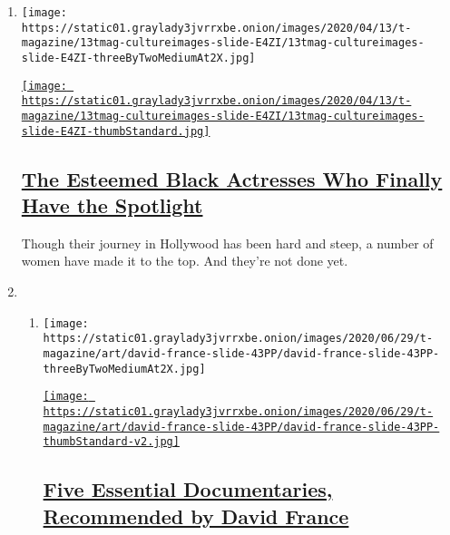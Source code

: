 \begin{enumerate}
\def\labelenumi{\arabic{enumi}.}
\item
  \texttt{[image: https://static01.graylady3jvrrxbe.onion/images/2020/04/13/t-magazine/13tmag-cultureimages-slide-E4ZI/13tmag-cultureimages-slide-E4ZI-threeByTwoMediumAt2X.jpg]}

  \href{/interactive/2020/04/13/t-magazine/black-actresses-bassett-berry-blige-henson-whitfield-elise.html}{\texttt{[image: https://static01.graylady3jvrrxbe.onion/images/2020/04/13/t-magazine/13tmag-cultureimages-slide-E4ZI/13tmag-cultureimages-slide-E4ZI-thumbStandard.jpg]}}

  \hypertarget{the-esteemed-black-actresses-who-finally-have-the-spotlight}{%
  \subsection{\texorpdfstring{\href{/interactive/2020/04/13/t-magazine/black-actresses-bassett-berry-blige-henson-whitfield-elise.html}{The
  Esteemed Black Actresses Who Finally Have the
  Spotlight}}{The Esteemed Black Actresses Who Finally Have the Spotlight}}\label{the-esteemed-black-actresses-who-finally-have-the-spotlight}}

  Though their journey in Hollywood has been hard and steep, a number of
  women have made it to the top. And they're not done yet.
\item
  \begin{enumerate}
  \def\labelenumii{\arabic{enumii}.}
  \item
    \texttt{[image: https://static01.graylady3jvrrxbe.onion/images/2020/06/29/t-magazine/art/david-france-slide-43PP/david-france-slide-43PP-threeByTwoMediumAt2X.jpg]}

    \href{/2020/06/29/t-magazine/david-france-documentary-watch-list.html}{\texttt{[image: https://static01.graylady3jvrrxbe.onion/images/2020/06/29/t-magazine/art/david-france-slide-43PP/david-france-slide-43PP-thumbStandard-v2.jpg]}}

    \hypertarget{five-essential-documentaries-recommended-by-david-france}{%
    \subsection{\texorpdfstring{\href{/2020/06/29/t-magazine/david-france-documentary-watch-list.html}{Five
    Essential Documentaries, Recommended by David
    France}}{Five Essential Documentaries, Recommended by David France}}\label{five-essential-documentaries-recommended-by-david-france}}


\end{enumerate}
\end{enumerate}
